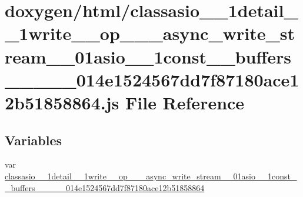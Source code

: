\hypertarget{classasio__1__1detail__1__1write____op__3__01__async__write__stream__00__01asio__1__1const____buf293717e0ff422ed2adde1fbc801cbb8}{}\section{doxygen/html/classasio\+\_\+\_\+1detail\+\_\+\_\+1write\+\_\+\+\_\+op\+\_\+\_\+\_\+async\+\_\+write\+\_\+stream\+\_\+\_\+01asio\+\_\+\_\+1const\+\_\+\+\_\+buffers\+\_\+\+\_\+\_\+\_\+\_\+014e1524567dd7f87180ace12b51858864.js File Reference}
\label{classasio__1__1detail__1__1write____op__3__01__async__write__stream__00__01asio__1__1const____buf293717e0ff422ed2adde1fbc801cbb8}
\subsection*{Variables}
\begin{DoxyCompactItemize}
\item 
var \hyperlink{classasio__1__1detail__1__1write____op__3__01__async__write__stream__00__01asio__1__1const____buf293717e0ff422ed2adde1fbc801cbb8_a10d0cd69dd4c72e60d7c0db812b869b6}{classasio\+\_\+\_\+1detail\+\_\+\_\+1write\+\_\+\+\_\+op\+\_\+\_\+\_\+async\+\_\+write\+\_\+stream\+\_\+\_\+01asio\+\_\+\_\+1const\+\_\+\+\_\+buffers\+\_\+\+\_\+\_\+\_\+\_\+014e1524567dd7f87180ace12b51858864}
\end{DoxyCompactItemize}


